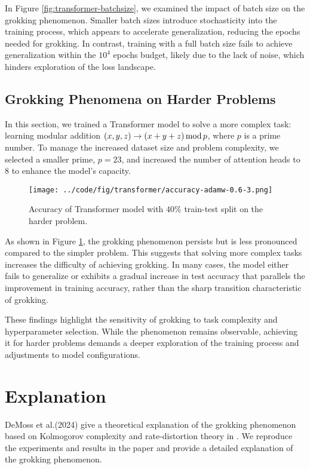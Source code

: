 \documentclass{article}
\begin{document}
In Figure \ref{fig:transformer-batchsize}, we examined the impact of batch size on the grokking phenomenon. Smaller batch sizes introduce stochasticity into the training process, which appears to accelerate generalization, reducing the epochs needed for grokking. In contrast, training with a full batch size fails to achieve generalization within the $10^4$ epochs budget, likely due to the lack of noise, which hinders exploration of the loss landscape.

\subsection{Grokking Phenomena on Harder Problems}

In this section, we trained a Transformer model to solve a more complex task: learning modular addition $(x, y, z) \rightarrow (x + y + z)\, {\rm mod}\, p$, where $p$ is a prime number. To manage the increased dataset size and problem complexity, we selected a smaller prime, $p=23$, and increased the number of attention heads to 8 to enhance the model's capacity.

\begin{figure}[ht]
    \centering
    \texttt{[image: ../code/fig/transformer/accuracy-adamw-0.6-3.png]}
    \caption{Accuracy of Transformer model with $40\%$ train-test split on the harder problem.}
    \label{fig:transformer-harder}
\end{figure}

As shown in Figure \ref{fig:transformer-harder}, the grokking phenomenon persists but is less pronounced compared to the simpler problem. This suggests that solving more complex tasks increases the difficulty of achieving grokking. In many cases, the model either fails to generalize or exhibits a gradual increase in test accuracy that parallels the improvement in training accuracy, rather than the sharp transition characteristic of grokking.

These findings highlight the sensitivity of grokking to task complexity and hyperparameter selection. While the phenomenon remains observable, achieving it for harder problems demands a deeper exploration of the training process and adjustments to model configurations.

\section{Explanation}

DeMoss et al.(2024) give a theoretical explanation of the grokking phenomenon based on Kolmogorov complexity and rate-distortion theory in \cite{demoss2024complexity}. We reproduce the experiments and results in the paper and provide a detailed explanation of the grokking phenomenon.
\end{document}
